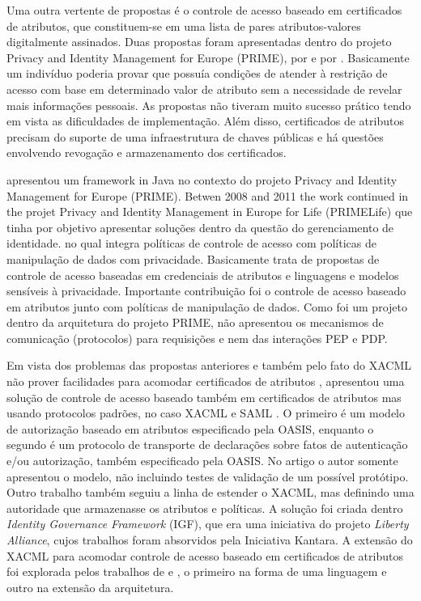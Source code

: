 \documentclass{doublecol-new}
\begin{document}
Uma outra vertente de propostas é o controle de acesso baseado em certificados de atributos, que constituem-se em uma lista de pares atributos-valores digitalmente assinados. Duas propostas foram apresentadas dentro do projeto Privacy and Identity Management for Europe (PRIME), por \citep{ardagna2008privacy} e por \citep{ardagna2010exploiting}. Basicamente um indivíduo poderia provar que possuía condições de atender à restrição de acesso com base em determinado valor de atributo sem a necessidade de revelar mais informações pessoais. As propostas não tiveram muito sucesso prático tendo em vista as dificuldades de implementação. Além disso, certificados de atributos precisam do suporte de uma infraestrutura de chaves públicas e há questões envolvendo revogação e armazenamento dos certificados.

\cite{ardagna2008privacy} apresentou um framework in Java no contexto do projeto Privacy and Identity Management for Europe (PRIME). Betwen 2008 and 2011 the work continued in the projet Privacy and Identity Management in Europe for Life (PRIMELife) que tinha por objetivo apresentar soluções dentro da questão do gerenciamento de identidade. no qual integra políticas de controle de acesso com políticas de manipulação de dados com privacidade. Basicamente trata de propostas de controle de acesso baseadas em credenciais de atributos e linguagens e modelos sensíveis à privacidade. Importante contribuição foi o controle de acesso baseado em atributos junto com políticas de manipulação de dados. Como foi um projeto dentro da arquitetura do projeto PRIME, não apresentou os mecanismos de comunicação (protocolos) para requisições e nem das interações PEP e PDP.

Em vista dos problemas das propostas anteriores e também pelo fato do XACML não prover facilidades para acomodar certificados de atributos \citep{dagdee2011extending}, \citep{ardagna2010enabling} apresentou uma solução de controle de acesso baseado também em certificados de atributos mas usando protocolos padrões, no caso XACML \citep{rissanen2013extensible} e SAML \citep{ragouzis2008security}. O primeiro é um modelo de autorização baseado em atributos especificado pela OASIS, enquanto o segundo é um protocolo de transporte de declarações sobre fatos de autenticação e/ou autorização, também especificado pela OASIS. No artigo o autor somente apresentou o modelo, não incluindo testes de validação de um possível protótipo. Outro trabalho \cite{kounga2010extending} também seguiu a linha de estender o XACML, mas definindo uma autoridade que armazenasse os atributos e políticas. A solução foi criada dentro \textit{Identity Governance Framework} (IGF), que era uma iniciativa do projeto \textit{Liberty Alliance}, cujos trabalhos foram absorvidos pela Iniciativa Kantara. A extensão do XACML para acomodar controle de acesso baseado em certificados de atributos foi explorada pelos trabalhos de  \cite{camenisch2009credential} e  \cite{dagdee2011extending}, o primeiro na forma de uma linguagem e outro na extensão da arquitetura.
\end{document}
